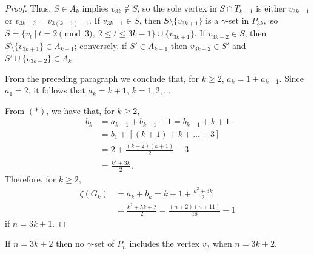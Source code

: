 \documentclass[twoside,12pt]{article}
\begin{document}
\begin{proof}
	\indent Thus, $S\in A_k$ implies $v_{3k}\notin S$, so the sole vertex in $S\cap T_{k-1}$ is either $v_{3k-1}$ or $v_{3k-2}=v_{3(k-1)+1}$. If $v_{3k-1} \in S$, then $S\setminus \{v_{3k+1}\}$ is a $\gamma$-set in $P_{3k},$ so $S=\{v_t\ | \ t=2\pmod 3, \ 2\le t\le 3k-1\} \cup \{v_{3k+1}\}$. If $v_{3k-2} \in S$, then $S\setminus \{v_{3k+1}\} \in A_{k-1}$; conversely, if $S' \in A_{k-1}$ then $v_{3k-2} \in S'$ and $S'\cup \{v_{3k-2}\}\in A_k$.
	
	\indent From the preceding paragraph we conclude that, for $k\ge 2$, $a_k=1+a_{k-1}$. Since $a_1=2$, it follows that $a_k=k+1$, $k=1,2, \ldots$
	
	\indent From $(*)$, we have that, for $k\ge 2$,
	\begin{align}
	    b_k&=a_{k-1}+b_{k-1}+1 =b_{k-1}+k+1 \nonumber \\
	    &= b_1+[(k+1)+k+\ldots + 3] \nonumber \\
	    &=2+\frac{(k+2)(k+1)}2-3 \nonumber \\
	    &=\frac{k^2+3k}2. \nonumber
	\end{align} 
	Therefore, for $k\ge 2$,
	\begin{align}
	    \zeta(G_k)&=a_k+b_k=k+1+\frac{k^2+3k}2 \nonumber \\
	    &=\frac{k^2+5k+2}2 = \frac{(n+2)(n+11)}{18}-1 \nonumber
	\end{align}
	if $n=3k+1$.
	
	
	
	
	
	
	
\end{proof}
\begin{lemma}{\label{p1}}
	If $n=3k+2$ then no $\gamma$-set of $P_n$ includes the vertex $v_3$ when $n=3k+2$. \end{lemma}
\end{document}

